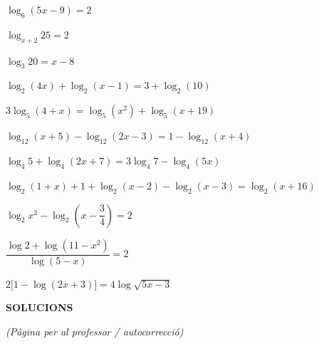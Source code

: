 \documentclass[12pt,a4paper]{article}
\begin{document}
\vspace{0.3cm}

\begin{exercicis}
    \item $\log_6(5x - 9) = 2$

    \item $\log_{x+2} 25 = 2$

    \item $\log_3 20 = x - 8$

    \item $\log_2(4x) + \log_2(x-1) = 3 + \log_2(10)$
    
    \item $3\log_5(4+x) = \log_5(x^2) + \log_5(x+19)$

    \item $\log_{12}(x+5) - \log_{12}(2x-3) = 1 - \log_{12}(x+4)$
    
    \item $\log_4 5 + \log_4(2x+7) = 3\log_4 7 - \log_4(5x)$
    \quad

    \item $\log_2(1+x) + 1 + \log_2(x-2) - \log_2(x-3) = \log_2(x+16)$
    
    
    \item $\log_2 x^2 - \log_2\!\left(x - \dfrac{3}{4}\right) = 2$

    \item $\dfrac{\log 2 + \log(11 - x^2)}{\log(5 - x)} = 2$

    \item $2\bigl[1 - \log(2x+3)\bigr] = 4\log\sqrt{5x-3}$
    
\end{exercicis}

\vspace{0.5cm}



\newpage

\begin{center}
    {\Large \textbf{SOLUCIONS}}
\end{center}
\vspace{0.1cm}
\begin{center}\textit{(Pàgina per al professor / autocorrecció)}\end{center}
\vspace{0.3cm}
\end{document}
